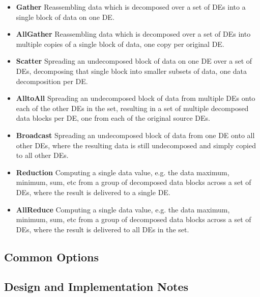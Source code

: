 \begin{itemize}

\item {\bf Gather}
Reassembling data which is decomposed over a set of DEs into a single
block of data on one DE.
\item {\bf AllGather}
Reassembling data which is decomposed over a set of DEs into multiple
copies of a single block of data, one copy per original DE.
\item {\bf Scatter}
Spreading an undecomposed block of data on one DE over a set of DEs,
decomposing that single block into smaller subsets of data, one
data decomposition per DE.
\item {\bf AlltoAll}
Spreading an undecomposed block of data from multiple DEs onto
each of the other DEs in the set, resulting in a set of multiple decomposed 
data blocks per DE, one from each of the original source DEs.
\item {\bf Broadcast}
Spreading an undecomposed block of data from one DE onto all other
DEs, where the resulting data is still undecomposed and simply
copied to all other DEs.
\item {\bf Reduction}
Computing a single data value, e.g. the data maximum, minimum, sum, etc
from a group of decomposed data blocks across a set of DEs, where the
result is delivered to a single DE.
\item {\bf AllReduce}
Computing a single data value, e.g. the data maximum, minimum, sum, etc
from a group of decomposed data blocks across a set of DEs, where the
result is delivered to all DEs in the set.

\end{itemize}

\subsection{Common Options}



\subsection{Design and Implementation Notes}

